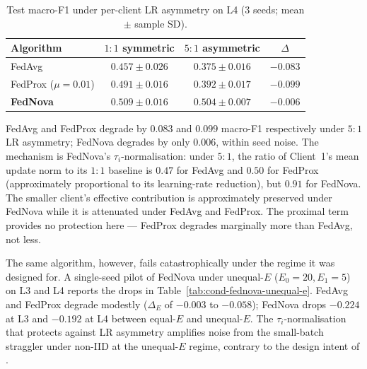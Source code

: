 \documentclass[11pt,a4paper]{report}
\begin{document}
\begin{table}[!htbp]
\centering
\caption{Test macro-F1 under per-client LR asymmetry on L4 (3 seeds; mean
$\pm$ sample SD).}
\label{tab:cond-lr-asymmetry}
\small
\begin{tabular}{lccc}
\toprule
Algorithm & $1{:}1$ symmetric & $5{:}1$ asymmetric & $\Delta$ \\
\midrule
FedAvg                  & $0.457 \pm 0.026$ & $0.375 \pm 0.016$ & $-0.083$ \\
FedProx ($\mu = 0.01$)  & $0.491 \pm 0.016$ & $0.392 \pm 0.017$ & $-0.099$ \\
\textbf{FedNova}        & $\mathbf{0.509 \pm 0.016}$ & $\mathbf{0.504 \pm 0.007}$ & $\mathbf{-0.006}$ \\
\bottomrule
\end{tabular}
\end{table}

FedAvg and FedProx degrade by $0.083$ and $0.099$ macro-F1 respectively under
$5{:}1$ LR asymmetry; FedNova degrades by only $0.006$, within seed noise.
The mechanism is FedNova's $\tau_i$-normalisation: under $5{:}1$, the ratio of
Client~1's mean update norm to its $1{:}1$ baseline is $0.47$ for FedAvg and
$0.50$ for FedProx (approximately proportional to its learning-rate
reduction), but $0.91$ for FedNova. The smaller client's effective
contribution is approximately preserved under FedNova while it is attenuated
under FedAvg and FedProx. The proximal term provides no protection here ---
FedProx degrades marginally more than FedAvg, not less.

The same algorithm, however, fails catastrophically under the regime it was
designed for. A single-seed pilot of FedNova under unequal-$E$
($E_0 = 20, E_1 = 5$) on L3 and L4 reports the drops in
Table~\ref{tab:cond-fednova-unequal-e}. FedAvg and FedProx degrade modestly
($\Delta_E$ of $-0.003$ to $-0.058$); FedNova drops $-0.224$ at L3 and
$-0.192$ at L4 between equal-$E$ and unequal-$E$. The $\tau_i$-normalisation
that protects against LR asymmetry amplifies noise from the small-batch
straggler under non-IID at the unequal-$E$ regime, contrary to the design
intent of \citet{wang2020fednova}.
\end{document}
